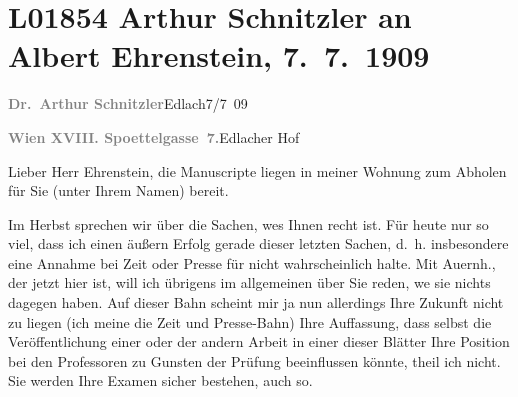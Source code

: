 

\section[Arthur Schnitzler an Albert Ehrenstein, 7. 7. 1909]{L01854 Arthur Schnitzler an Albert Ehrenstein, 7. 7. 1909}
\nopagebreak{}
\rehead{ }\normalsize\beginnumbering{}
\toendnotes[C]{\smallbreak\pagebreak[2]}
\toendnotes[C]{\smallbreak}
\pstart
           {\pb}\textcolor{gray}{\textbf{Dr. Arthur Schnitzler}}\hfill Edlach7/7 09\pend
           
\pstart
           \textcolor{gray}{\textbf{Wien XVIII. Spoettelgasse 7.}}\hfill Edlacher Hof\pend
           
\pstart{}Lieber Herr Ehrenstein,\pend\vspace{0.5em}
\pstart
           die Manuscripte liegen in meiner Wohnung zum Abholen für Sie (unter Ihrem Namen)
               bereit.\pend
           
\pstart
           Im Herbst sprechen wir über die Sachen, we{\geminationn}s Ihnen recht
               ist. Für heute nur so viel, {\pb}dass ich einen äußern Erfolg gerade
               dieser letzten Sachen, d. h. insbesondere eine Annahme bei Zeit oder Presse für nicht
               wahrscheinlich halte. Mit Auernh., der jetzt
               hier ist, will ich übrigens im allgemeinen über Sie reden, we{\geminationn} sie nichts dagegen haben. Auf dieser Bahn scheint mir
               ja nun {\pb}allerdings Ihre Zukunft nicht zu liegen (ich meine die
                  Zeit und Presse-Bahn) Ihre Auffassung, dass \introOben{}selbst\introOben{} die
               Veröffentlichung einer oder der andern Arbeit in einer dieser Blätter Ihre Position
               bei den Professoren zu Gunsten der Prüfung beeinflussen könnte, theil ich nicht. Sie
               werden Ihre {\pb}Examen sicher bestehen, auch so.\pend
           
